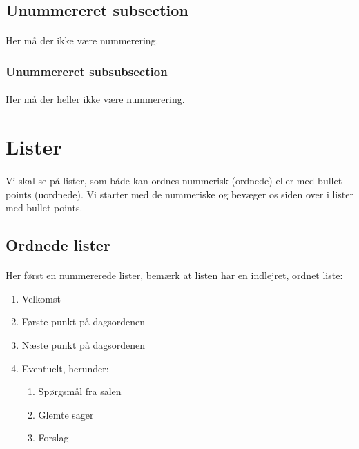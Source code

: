 \documentclass{article}
\begin{document}
\begin{enumerate}
\subsection*{Unummereret subsection}
\paragraph{}
    Her må der ikke være nummerering.
\subsubsection*{Unummereret subsubsection}
\paragraph{}
    Her må der heller ikke være nummerering.
\section{Lister}
\paragraph{}
Vi skal se på lister, som både kan ordnes nummerisk (ordnede) eller med bullet points (uordnede). Vi starter med de nummeriske og bevæger os siden over i lister med bullet points.
\subsection{Ordnede lister}
\paragraph{} 
Her først en nummererede lister, bemærk at listen har en indlejret, ordnet liste:

\begin{enumerate}
    \item Velkomst
    \item Første punkt på dagsordenen
    \item Næste punkt på dagsordenen
    \item Eventuelt, herunder:
    \begin{enumerate}
        \item Spørgsmål fra salen
        \item Glemte sager
        \item Forslag
    \end{enumerate}
\end{enumerate}

\end{enumerate}
\end{document}
